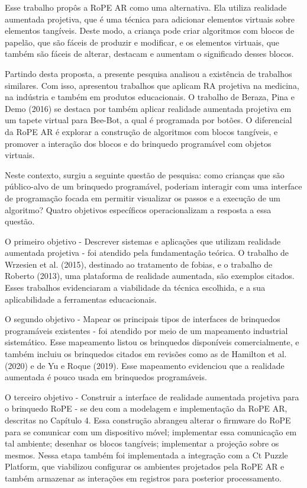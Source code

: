 Esse trabalho propôs a RoPE AR como uma alternativa. Ela utiliza realidade aumentada projetiva, que é uma técnica para adicionar elementos virtuais sobre elementos tangíveis. Deste modo, a criança pode criar algoritmos com blocos de papelão, que são fáceis de produzir e modificar, e os elementos virtuais, que também são fáceis de alterar, destacam e aumentam o significado desses blocos.

Partindo desta proposta, a presente pesquisa analisou a existência de trabalhos similares. Com isso, apresentou trabalhos que aplicam RA projetiva na medicina, na indústria e também em produtos educacionais. O trabalho de Beraza, Pina e Demo (2016) se destaca por também aplicar realidade aumentada projetiva em um tapete virtual para Bee-Bot, a qual é programada por botões. O diferencial da RoPE AR é explorar a construção de algoritmos com blocos tangíveis, e promover a interação dos blocos e do brinquedo programável com objetos virtuais.

Neste contexto, surgiu a seguinte questão de pesquisa: como crianças que são público-alvo de um brinquedo programável, poderiam interagir com uma interface de programação focada em permitir visualizar os passos e a execução de um algoritmo? Quatro objetivos específicos operacionalizam a resposta a essa questão.

O primeiro objetivo - Descrever sistemas e aplicações que utilizam realidade aumentada projetiva - foi atendido pela fundamentação teórica. O trabalho de Wrzesien et al. (2015), destinado ao tratamento de fobias, e o trabalho de Roberto (2013), uma plataforma de realidade aumentada, são exemplos citados. Esses trabalhos evidenciaram a viabilidade da técnica escolhida, e a sua aplicabilidade a ferramentas educacionais. 

O segundo objetivo - Mapear os principais tipos de interfaces de brinquedos programáveis existentes - foi atendido por meio de um mapeamento industrial sistemático. Esse mapeamento listou os brinquedos disponíveis comercialmente, e também incluiu os brinquedos citados em revisões como as de Hamilton et al. (2020) e de Yu e Roque (2019). Esse mapeamento evidenciou que a realidade aumentada é pouco usada em brinquedos programáveis.

O terceiro objetivo - Construir a interface de realidade aumentada projetiva para o brinquedo RoPE - se deu com a modelagem e implementação da RoPE AR, descritas no Capítulo 4. Essa construção abrangeu alterar o firmware do RoPE para se comunicar com um dispositivo móvel; implementar essa comunicação em tal ambiente; desenhar os blocos tangíveis; implementar a projeção sobre os mesmos. Nessa etapa também foi implementada a integração com a Ct Puzzle Platform, que viabilizou configurar os ambientes projetados pela RoPE AR e também armazenar as interações em registros para posterior processamento.

